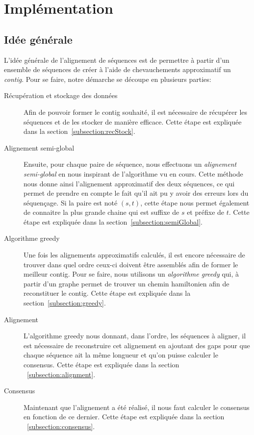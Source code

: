 \section{Implémentation}

\subsection{Idée générale}

	L'idée générale de l'alignement de séquences est de permettre à partir d'un ensemble de séquences de créer à l'aide de chevauchements approximatif un \emph{contig}. Pour se faire, notre démarche se découpe en plusieurs parties:

	\begin{description}
		\item[Récupération et stockage des données] Afin de pouvoir former le contig souhaité, il est nécessaire de récupérer les séquences et de les stocker de manière efficace. Cette étape est expliquée dans la section~\ref{subsection:recStock}.

		\item[Alignement semi-global] Ensuite, pour chaque paire de séquence,
			nous effectuons un \emph{alignement semi-global} en nous inspirant
			de l'algorithme vu en cours. Cette méthode nous donne ainsi
			l'alignement approximatif des deux séquences, ce qui permet de
			prendre en compte le fait qu'il ait pu y avoir des erreurs lors du
			séquençage. Si la paire est noté $(s, t)$, cette étape nous permet également de connaitre la plus
			grande chaine qui est suffixe de $s$ et préfixe de $t$. Cette étape
			est expliquée dans la section~\ref{subsection:semiGlobal}.

		\item[Algorithme greedy] Une fois les alignements approximatifs
			calculés, il est encore nécessaire de trouver dans quel ordre
			ceux-ci doivent être assemblés afin de former le meilleur contig.
			Pour se faire, nous utilisons un \emph{algorithme greedy} qui, à
			partir d'un graphe permet de trouver un chemin hamiltonien afin de
			reconstituer le contig. Cette étape est expliquée dans la
			section~\ref{subsection:greedy}.

		\item[Alignement]
			L'algorithme greedy nous donnant, dans l'ordre, les séquences à
			aligner, il est nécessaire de reconstruire cet alignement en
			ajoutant des gaps pour que chaque séquence ait la même longueur et
			qu'on puisse calculer le consensus. Cette étape est expliquée dans
			la section ~\ref{subsection:alignment}.

		\item[Consensus]
			Maintenant que l'alignement a été réalisé, il nous faut calculer le
			consensus en fonction de ce dernier. Cette étape est expliquée dans
			la section ~\ref{subsection:consensus}.
	\end{description}

